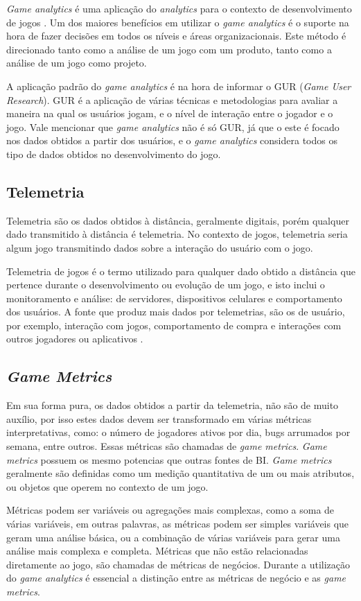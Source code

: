 \textit{Game analytics} é uma aplicação do \textit{analytics} para o contexto de desenvolvimento de jogos \cite{game_analytics}. Um dos maiores benefícios em utilizar o \textit{game analytics} é o suporte na hora de fazer decisões em todos os níveis e áreas organizacionais. Este método é direcionado tanto como a análise de um jogo com um produto, tanto como a análise de um jogo como projeto.

A aplicação padrão do \textit{game analytics} é na hora de informar o GUR (\textit{Game User Research}). GUR é a aplicação de várias técnicas e metodologias para avaliar a maneira na qual os usuários jogam, e o nível de interação entre o jogador e o jogo. Vale mencionar que \textit{game analytics} não é só GUR, já que o este é focado nos dados obtidos a partir dos usuários, e o \textit{game analytics} considera todos os tipo de dados obtidos no desenvolvimento do jogo.
\subsection{Telemetria}
Telemetria são os dados obtidos à distância, geralmente digitais, porém qualquer dado transmitido à distância é telemetria. No contexto de jogos, telemetria seria algum jogo transmitindo dados sobre a interação do usuário com o jogo.

Telemetria de jogos é o termo utilizado para qualquer dado obtido a distância que pertence durante o desenvolvimento ou evolução de um jogo, e isto inclui o monitoramento e análise: de servidores, dispositivos celulares e comportamento dos usuários. A fonte que produz mais dados por telemetrias, são os de usuário, por exemplo, interação com jogos, comportamento de compra e interações com outros jogadores ou aplicativos \cite{telemetry}.
\subsection{\textit{Game Metrics}}
Em sua forma pura, os dados obtidos a partir da telemetria, não são de muito auxílio, por isso estes dados devem ser transformado em várias métricas interpretativas, como: o número de jogadores ativos por dia, bugs arrumados por semana, entre outros. Essas métricas são chamadas de \textit{game metrics}. \textit{Game metrics} possuem os mesmo potencias que outras fontes de BI. \textit{Game metrics} geralmente são definidas como um medição quantitativa de um ou mais atributos, ou objetos que operem no contexto de um jogo.

Métricas podem ser variáveis ou  agregações mais complexas, como a soma de várias variáveis, em outras palavras, as métricas podem ser simples variáveis que geram uma análise básica, ou a combinação de várias variáveis para gerar uma análise mais complexa e completa. Métricas que não estão relacionadas diretamente ao jogo, são chamadas de métricas de negócios. Durante a utilização do \textit{game analytics} é essencial a distinção entre as métricas de negócio e as \textit{game metrics}.

